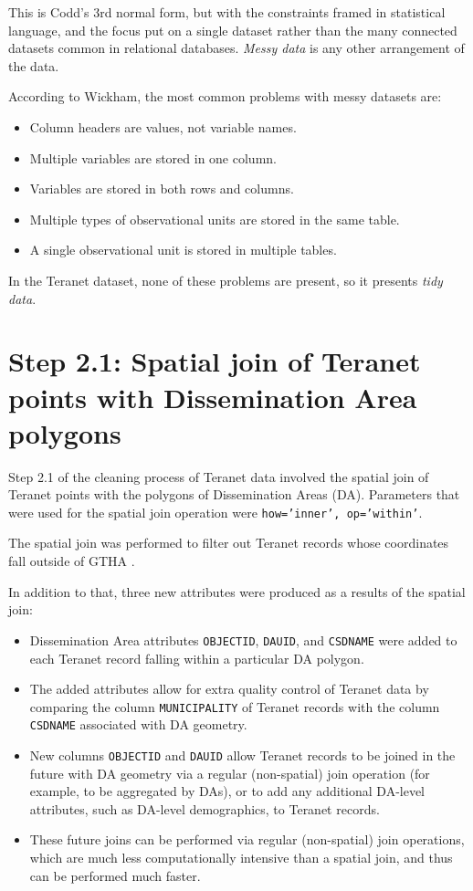 This is Codd's 3rd normal form\cite{Codd1990}, but with the constraints framed in statistical
language, and the focus put on a single dataset rather than the many connected datasets common in relational databases.
\textit{Messy data} is any other arrangement of the data.

\vspace{5mm}

According to Wickham, the most common problems with messy datasets are:
\begin{itemize}
    \item Column headers are values, not variable names.
    \item Multiple variables are stored in one column.
    \item Variables are stored in both rows and columns.
    \item Multiple types of observational units are stored in the same table.
    \item A single observational unit is stored in multiple tables.
\end{itemize}

In the Teranet dataset, none of these problems are present, so it presents \textit{tidy data}.

\section{Step 2.1: Spatial join of Teranet points with Dissemination Area polygons} \label{sec:teranet_da_spatial_join}

Step 2.1 of the cleaning process of Teranet data involved the spatial join of Teranet points with the polygons of Dissemination Areas (DA).
Parameters that were used for the spatial join operation were \texttt{how='inner', op='within'}.

The spatial join was performed to filter out Teranet records whose coordinates fall outside of GTHA .

In addition to that, three new attributes were produced as a results of the spatial join:
\begin{itemize}
    \item Dissemination Area attributes \texttt{OBJECTID}, \texttt{DAUID}, and \texttt{CSDNAME} were added to each Teranet record falling within a particular DA polygon.
    \item The added attributes allow for extra quality control of Teranet data by comparing the column \texttt{MUNICIPALITY} of Teranet records with the column \texttt{CSDNAME} associated with DA geometry.
    \item New columns \texttt{OBJECTID} and \texttt{DAUID} allow Teranet records to be joined in the future with DA geometry via a regular (non-spatial) join operation (for example, to be aggregated by DAs), or to add any additional DA-level attributes, such as DA-level demographics, to Teranet records.
    \item These future joins can be performed via regular (non-spatial) join operations, which are much less computationally intensive than a spatial join, and thus can be performed much faster.
\end{itemize}

